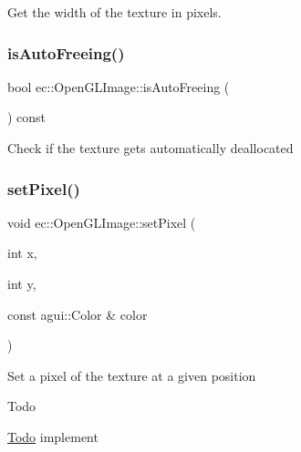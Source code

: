 Get the width of the texture in pixels. \mbox{\label{classec_1_1_open_g_l_image_a5d441f3a70726dcf21ab70e2edbbdf9d}} 
\subsubsection{\texorpdfstring{is\+Auto\+Freeing()}{isAutoFreeing()}}
{\footnotesize\ttfamily bool ec\+::\+Open\+G\+L\+Image\+::is\+Auto\+Freeing (\begin{DoxyParamCaption}{ }\end{DoxyParamCaption}) const\hspace{0.3cm}{\ttfamily [override]}}

Check if the texture gets automatically deallocated \mbox{\label{classec_1_1_open_g_l_image_a0f10c45c14e5092b1b7b5a57d09f2682}} 
\subsubsection{\texorpdfstring{set\+Pixel()}{setPixel()}}
{\footnotesize\ttfamily void ec\+::\+Open\+G\+L\+Image\+::set\+Pixel (\begin{DoxyParamCaption}\item[{int}]{x,  }\item[{int}]{y,  }\item[{const agui\+::\+Color \&}]{color }\end{DoxyParamCaption})\hspace{0.3cm}{\ttfamily [override]}}

Set a pixel of the texture at a given position \begin{DoxyRefDesc}{Todo}
\item[\mbox{\hyperlink{todo__todo000018}{Todo}}]implement \end{DoxyRefDesc}
\mbox{\label{classec_1_1_open_g_l_image_ac2ac8ff7716843a697e269e172788961}} 
